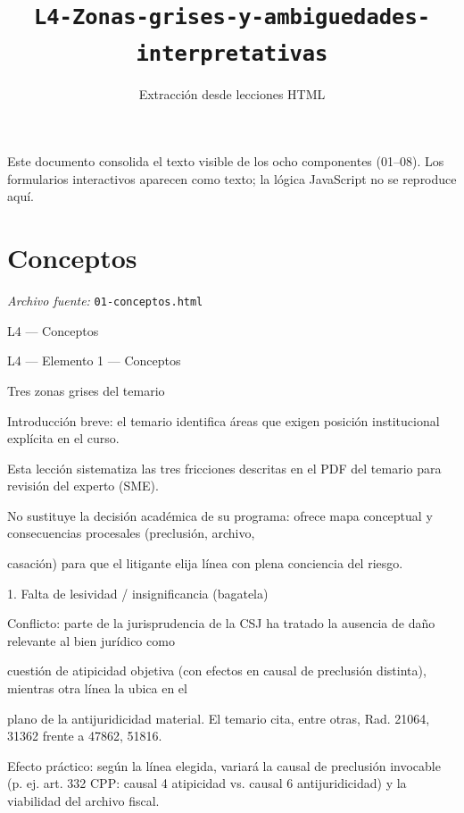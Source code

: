 \documentclass[11pt,a4paper]{article}
\title{\texttt{L4-Zonas-grises-y-ambiguedades-interpretativas}}
\author{Extracci\'on desde lecciones HTML}
\date{}
\begin{document}
\maketitle

\begin{small}
\noindent Este documento consolida el texto visible de los ocho componentes (01--08). Los formularios interactivos aparecen como texto; la l\'ogica JavaScript no se reproduce aqu\'i.
\end{small}
\bigskip
\section{Conceptos}
\noindent\textit{Archivo fuente:} \texttt{01-conceptos.html}

L4 — Conceptos\par





    L4 — Elemento 1 — Conceptos\par
    Tres zonas grises del temario\par

    Introducción breve: el temario identifica áreas que exigen posición institucional explícita en el curso.\par


      Esta lección sistematiza las tres fricciones descritas en el PDF del temario para revisión del experto (SME).\par
      No sustituye la decisión académica de su programa: ofrece mapa conceptual y consecuencias procesales (preclusión, archivo,\par
      casación) para que el litigante elija línea con plena conciencia del riesgo.\par



      1. Falta de lesividad / insignificancia (bagatela)\par


        Conflicto: parte de la jurisprudencia de la CSJ ha tratado la ausencia de daño relevante al bien jurídico como\par
        cuestión de atipicidad objetiva (con efectos en causal de preclusión distinta), mientras otra línea la ubica en el\par
        plano de la antijuridicidad material. El temario cita, entre otras, Rad. 21064, 31362 frente a 47862, 51816.\par


      Efecto práctico: según la línea elegida, variará la causal de preclusión invocable (p. ej. art. 332 CPP: causal 4 atipicidad vs. causal 6 antijuridicidad) y la viabilidad del archivo fiscal.\par
\end{document}
